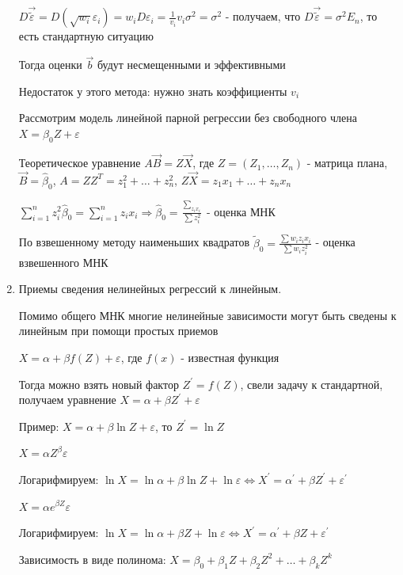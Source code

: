 \begin{enumerate}
    $D \vec \tilde{\varepsilon} = D(\sqrt{w_i} \varepsilon_i) = w_i D \varepsilon_i = \frac{1}{v_i} v_i \sigma^2 = \sigma^2$ - получаем, что $D \vec \tilde{\varepsilon} = \sigma^2 E_n$, то есть стандартную ситуацию

    Тогда оценки $\vec b$ будут несмещенными и эффективными

    Недостаток у этого метода: нужно знать коэффициенты $v_i$

    \Ex Рассмотрим модель линейной парной регрессии без свободного члена $X = \beta_0 Z + \varepsilon$

    Теоретическое уравнение $A \vec B = Z \vec X$, где $Z = \left(Z_1, \dots, Z_n\right)$ - матрица плана, $\vec B = \hat \beta_0$, $A = Z Z^T = z_1^2 + \dots + z_n^2$, $Z \vec X = z_1 x_1 + \dots + z_n x_n$

    $\sum_{i = 1}^n z^2_i \hat \beta_0 = \sum_{i = 1}^n z_i x_i \Longrightarrow \hat \beta_0 = \frac{\sum_{z_i x_i}}{\sum z^2_i}$ - оценка МНК 

    По взвешенному методу наименьших квадратов $\tilde \beta_0 = \frac{\sum w_i z_i x_i}{\sum w_i z_i^2}$ - оценка взвешенного МНК

    \item Приемы сведения нелинейных регрессий к линейным.

    Помимо общего МНК многие нелинейные зависимости могут быть сведены к линейным при помощи простых приемов

     $X = \alpha + \beta f(Z) + \varepsilon$, где $f(x)$ - известная функция

    Тогда можно взять новый фактор $Z^\prime = f(Z)$, свели задачу к стандартной, получаем уравнение $X = \alpha + \beta Z^\prime + \varepsilon$

    Пример: $X = \alpha + \beta \ln Z + \varepsilon$, то $Z^\prime = \ln Z$

     $X = \alpha Z^\beta \varepsilon$

    Логарифмируем: $\ln X = \ln \alpha + \beta \ln Z + \ln \varepsilon \Longleftrightarrow X^\prime = \alpha^\prime + \beta Z^\prime + \varepsilon^\prime$

     $X = \alpha e^{\beta Z} \varepsilon$

    Логарифмируем: $\ln X = \ln \alpha + \beta Z + \ln \varepsilon \Longleftrightarrow X^\prime = \alpha^\prime + \beta Z + \varepsilon^\prime$

     Зависимость в виде полинома: $X = \beta_0 + \beta_1 Z + \beta_2 Z^2 + \dots + \beta_k Z^k$


\end{enumerate}
